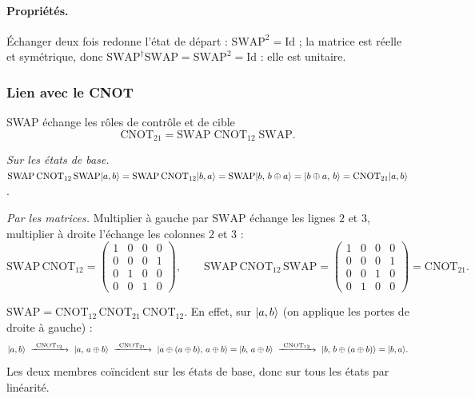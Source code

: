 \paragraph{Propriétés.} Échanger deux fois redonne l'état de départ :
$\mathrm{SWAP}^2=\mathrm{Id}$ ; la matrice est réelle et symétrique, donc
$\mathrm{SWAP}^\dagger\mathrm{SWAP}=\mathrm{SWAP}^2=\mathrm{Id}$ : elle est unitaire.

\subsubsection{Lien avec le CNOT}

\begin{resultat}{SWAP échange les rôles de contrôle et de cible}
\[
  \mathrm{CNOT}_{21}=\mathrm{SWAP}\;\mathrm{CNOT}_{12}\;\mathrm{SWAP}.
\]
\end{resultat}

\emph{Sur les états de base.}
$\mathrm{SWAP}\,\mathrm{CNOT}_{12}\,\mathrm{SWAP}|a,b\rangle
=\mathrm{SWAP}\,\mathrm{CNOT}_{12}|b,a\rangle
=\mathrm{SWAP}|b,\,b\oplus a\rangle=|b\oplus a,\,b\rangle=\mathrm{CNOT}_{21}|a,b\rangle$.

\emph{Par les matrices.} Multiplier à gauche par $\mathrm{SWAP}$ échange les lignes $2$ et
$3$, multiplier à droite l'échange les colonnes $2$ et $3$ :
\[
  \mathrm{SWAP}\,\mathrm{CNOT}_{12}
  =\begin{pmatrix}1&0&0&0\\0&0&0&1\\0&1&0&0\\0&0&1&0\end{pmatrix},
  \qquad
  \mathrm{SWAP}\,\mathrm{CNOT}_{12}\,\mathrm{SWAP}
  =\begin{pmatrix}1&0&0&0\\0&0&0&1\\0&0&1&0\\0&1&0&0\end{pmatrix}=\mathrm{CNOT}_{21}.
\]

\begin{remarque}
$\mathrm{SWAP}=\mathrm{CNOT}_{12}\,\mathrm{CNOT}_{21}\,\mathrm{CNOT}_{12}$. En effet, sur
$|a,b\rangle$ (on applique les portes de droite à gauche) :
\[
  \ket{a,b}\ \xrightarrow{\ \mathrm{CNOT}_{12}\ }\ \ket{a,\,a\oplus b}
  \ \xrightarrow{\ \mathrm{CNOT}_{21}\ }\ \ket{a\oplus(a\oplus b),\,a\oplus b}=\ket{b,\,a\oplus b}
  \ \xrightarrow{\ \mathrm{CNOT}_{12}\ }\ \ket{b,\,b\oplus(a\oplus b)}=\ket{b,a}.
\]
Les deux membres coïncident sur les états de base, donc sur tous les états par linéarité.
\end{remarque}

